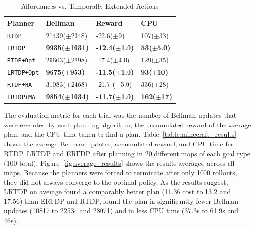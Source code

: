 \documentclass[letterpaper]{article}
\newcommand{\dnote}[1]{\textcolor{Green}{\textbf{}}}
\newcommand{\ra}[1]{\renewcommand{\arraystretch}{#1}} %
\begin{document}
\begin{table}[b]
\ra{1.3}
\begin{tabular}{@{}llll@{}}\toprule
Planner & Bellman & Reward & CPU \\ \midrule
\texttt{RTDP}   			&	27439($\pm$2348)	&	-22.6($\pm$9)& 107($\pm$33) \\
\texttt{LRTDP} 			& 	{\bf 9935($\pm$1031)}	&	{\bf -12.4($\pm$1.0)}& \bf{53}($\pm$5.0) \\ \hline
\texttt{RTDP+Opt}  		&	26663($\pm$2298)	&	-17.4($\pm$4.0) & 129($\pm$35) \\
\texttt{LRTDP+Opt} 		& 	\bf{9675}($\pm$953)	&	\bf{-11.5}($\pm$1.0)&{\bf 93($\pm$10)} \\ \hline
\texttt{RTDP+MA}  		&	31083($\pm$2468)	&	-21.7	($\pm$5.0)&336($\pm$28) \\
\texttt{LRTDP+MA}  		& 	{\bf 9854($\pm$1034)}	&	{\bf -11.7($\pm$1.0)}&{\bf 162($\pm$17)} \\ %
\bottomrule
\end{tabular}
\label{table:temp_ext_act_results}
\caption{Affordances vs. Temporally Extended Actions}
\end{table}

The evaluation metric for each trial was the number of Bellman updates
that were executed by each planning algorithm, the accumulated reward of the average plan,
and the CPU time taken to find a plan. Table~\ref{table:minecraft_results} shows the average Bellman updates, accumulated reward, and CPU time
for RTDP, LRTDP and ERTDP after planning in 20 different maps of each goal type (100 total). Figure~\ref{fig:average_results} shows the results averaged across all maps. Because the planners were forced to terminate after only 1000 rollouts, they did not always converge to the optimal policy. As the results suggest, LRTDP on average found a comparably better plan (11.36 cost to 13.2 and 17.56) than ERTDP and RTDP, found the plan in significantly fewer Bellman updates (10817 to 22534 and 28071) and in less CPU time (37.3s to 61.9s and 46s).

\dnote{Put in a note about the threshold issues, maybe include the results below to reinforce threshold business}
\end{document}
